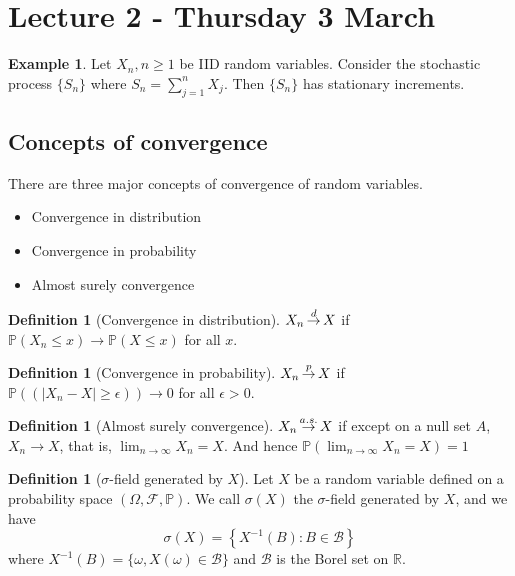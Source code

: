 \documentclass[10pt, oneside, reqno]{amsart}
\theoremstyle{plain}%
\theoremstyle{definition}
\newtheorem{defn}[thm]{Definition}
\newtheorem{exmp}[thm]{Example}
\theoremstyle{remark}
\newcommand{\prob}[1]{\mathbb{P}(#1)}
\newcommand{\R}{\mathbb{R}}
\renewcommand{\P}{\mathbb{P}}
\def\cip{\,{\buildrel p \over \rightarrow}\,}
\def\cid{\,{\buildrel d \over \rightarrow}\,}
\def\cas{\,{\buildrel a.s. \over \rightarrow}\,}
\begin{document}
\section{Lecture 2 - Thursday 3 March} %
\label{sec:lecture_2_thursday_3_march}

\begin{exmp}
	Let $X_n, n \geq 1$ be IID random variables.  Consider the stochastic process $\{ S_n \}$ where $S_n = \sum^n_{j=1} X_j$.  Then $\{ S_n \}$ has stationary increments.
\end{exmp}

\subsection{Concepts of convergence} %
\label{sub:convergence_in_distirbution}
There are three major concepts of convergence of random variables.
\begin{itemize}
	\item Convergence in distribution
	\item Convergence in probability
	\item Almost surely convergence
\end{itemize}

\begin{defn}[Convergence in distribution]
	$X_n \cid X$ if $\prob{X_n \leq x} \rightarrow \prob{ X \leq x}$ for all $x$.
\end{defn}

\begin{defn}[Convergence in probability]
	$X_n \cip X$ if $\prob{ (|X_n - X | \geq \epsilon)} \rightarrow 0$ for all $\epsilon > 0$.
\end{defn}

\begin{defn}[Almost surely convergence]
	$X_n \cas X$ if except on a null set $A$, $X_n \rightarrow X$, that is, $\lim_{n \rightarrow \infty} X_n = X$.  And hence $\prob{ \lim_{n \rightarrow \infty} X_n = X} = 1$
\end{defn}


\begin{defn}[$\sigma$-field generated by $X$]
	Let $X$ be a random variable defined on a probability space $(\Omega, \mathcal{F}, \P)$.  We call $\sigma(X)$ the $\sigma$-field generated by $X$, and we have \[
		\sigma(X) = \left\{ X^{-1}(B): B \in \mathcal{B} \right\}
	\] where $X^{-1}(B) = \{ \omega, X(\omega) \in \mathcal{B} \}$ and $\mathcal{B}$ is the Borel set on $\R$.
\end{defn}
\end{document}
